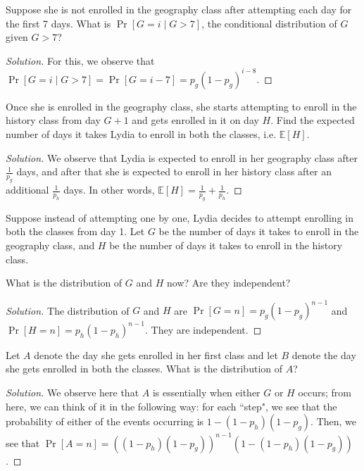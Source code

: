 \documentclass{article}
\newenvironment{solution}{\begin{proof}[Solution]}{\end{proof}}
\begin{document}
\begin{hw}
	Suppose she is not enrolled in the geography class after attempting each day for the first 7
	days. What is $\Pr[G = i \mid G > 7]$, the conditional distribution of $G$ given $G > 7$?
\end{hw}
\begin{solution}
	For this, we observe that $\Pr[G = i \mid G > 7] = \Pr[G = i - 7] = p_{g}(1-p_{g})^{i-8}$.
\end{solution}

\begin{hw}
	Once she is enrolled in the geography class, she starts attempting to enroll in the history class from day $G + 1$ and gets enrolled in it on day $H$. Find the expected number of days it takes Lydia to enroll in both the classes, i.e. $\mathbb{E}[H]$.
\end{hw}
\begin{solution}
	We observe that Lydia is expected to enroll in her geography class after $\frac{1}{p_{g}}$ days, and after that she is expected to enroll in her history class after an additional $\frac{1}{p_{h}}$ days. In other words, $\mathbb{E}[H] = \frac{1}{p_{g}} + \frac{1}{p_{h}}$.
\end{solution}

Suppose instead of attempting one by one, Lydia decides to attempt enrolling in both the classes from day 1. Let $G$ be the number of days it takes to enroll in the geography class, and $H$ be the number of days it takes to enroll in the history class.
\begin{hw}
	What is the distribution of $G$ and $H$ now? Are they independent?
\end{hw}
\begin{solution}
	The distribution of $G$ and $H$ are $\Pr[G=n] = p_{g}(1-p_{g})^{n-1}$ and $\Pr[H=n] = p_{h}(1-p_{h})^{n-1}$. They are independent.
\end{solution}

\begin{hw}
	Let $A$ denote the day she gets enrolled in her first class and let $B$ denote the day she gets enrolled in both the classes. What is the distribution of $A$?
\end{hw}
\begin{solution}
	We observe here that $A$ is essentially when either $G$ or $H$ occurs; from here, we can think of it in the following way: for each ``step", we see that the probability of either of the events occurring is $1-(1-p_{h})(1-p_{g})$. Then, we see that $\Pr[A = n] = \left( (1-p_{h})(1-p_{g}) \right)^{n-1}\left( 1-(1-p_{h})(1-p_{g}) \right)$.
\end{solution}
\end{document}
